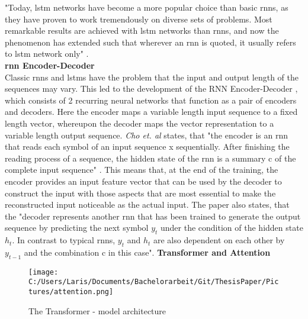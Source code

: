 \documentclass[a4paper, 11pt,titlepage,oneside,openany]{book}
\begin{document}
\noindent "Today, \gls{lstm} networks have become a more popular choice than basic \gls{rnn}s, as they have proven to work tremendously on diverse sets of problems. Most remarkable results are achieved with \gls{lstm} networks than \gls{rnn}s, and now the phenomenon has extended such that wherever an \gls{rnn} is quoted, it usually refers to \gls{lstm} network only" \cite{rnn}.\\

\noindent \textbf{\gls{rnn} Encoder-Decoder} \\
\noindent Classic \gls{rnn}s and \gls{lstm}s have the problem that the input and output length of the sequences may vary. This led to the development of the RNN Encoder-Decoder \cite{encodedecode}, which consists of 2 recurring neural networks that function as a pair of encoders and decoders. Here the encoder maps a variable length input sequence to a fixed length vector, whereupon the decoder maps the vector representation to a variable length output sequence. \textit{Cho et. al} states, that "the encoder is an \gls{rnn} that reads each symbol of an input sequence x sequentially. After finishing the reading process of a sequence, the hidden state of the \gls{rnn} is a summary c of the complete input sequence" \cite{encodedecode}. This means that, at the end of the training, the encoder provides an input feature vector that can be used by the decoder to construct the input with those aspects that are most essential to make the reconstructed input noticeable as the actual input. The paper also states, that the "decoder represents another \gls{rnn} that has been trained to generate the output sequence by predicting the next symbol $y_t$ under the condition of the hidden state $h_t$. In contrast to typical \gls{rnn}s, $y_t$ and $h_t$ are also dependent on each other by $y_{t-1}$ and the combination c in this case". 
\newpage
\noindent \textbf{Transformer and Attention} \\
\begin{figure}[h]
	\centering
	\texttt{[image: C:/Users/Laris/Documents/Bachelorarbeit/Git/ThesisPaper/Pictures/attention.png]}
	\caption{The Transformer - model architecture \cite{attention}}
\end{figure}\\
\end{document}
